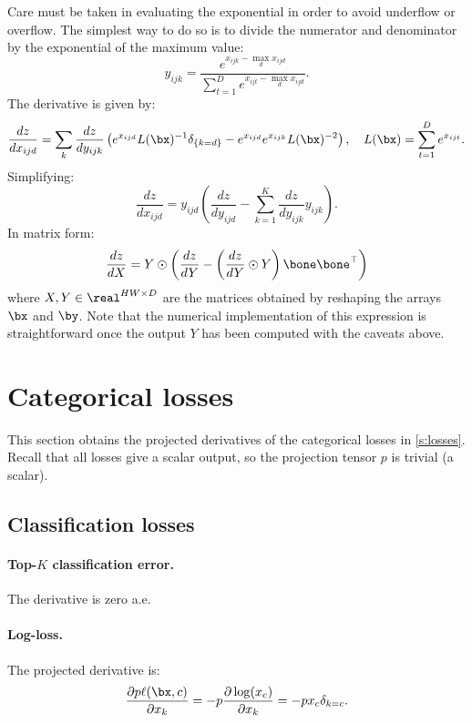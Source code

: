 Care must be taken in evaluating the exponential in order to avoid underflow or overflow. The simplest way to do so is to divide the numerator and denominator by the exponential of the maximum value:
\[
 y_{ijk} = \frac{e^{x_{ijk} - \max_d x_{ijd}}}{\sum_{t=1}^D e^{x_{ijt}- \max_d x_{ijd}}}.
\]
The derivative is given by:
\[
\frac{dz}{d x_{ijd}}
=
\sum_{k}
\frac{dz}{d y_{ijk}}
\left(
e^{x_{ijd}} L(\bx)^{-1} \delta_{\{k=d\}}
-
e^{x_{ijd}}
e^{x_{ijk}} L(\bx)^{-2}
\right),
\quad
L(\bx) = \sum_{t=1}^D e^{x_{ijt}}.
\]
Simplifying:
\[
\frac{dz}{d x_{ijd}}
=
y_{ijd} 
\left(
\frac{dz}{d y_{ijd}}
-
\sum_{k=1}^K
\frac{dz}{d y_{ijk}} y_{ijk}
\right).
\]
In matrix form:
\[
  \frac{dz}{dX} = Y \odot \left(\frac{dz}{dY} 
  - \left(\frac{dz}{dY} \odot Y\right) \bone\bone^\top\right)
\]
where $X,Y\in\real^{HW\times D}$ are the matrices obtained by reshaping the arrays
$\bx$ and $\by$. Note that the numerical implementation of this expression is straightforward once the output $Y$ has been computed with the caveats above.

\section{Categorical losses}\label{s:impl-losses}

This section obtains the projected derivatives of the categorical losses in \cref{s:losses}. Recall that all losses give a scalar output, so the projection tensor $p$ is trivial (a scalar).

\subsection{Classification losses}\label{s:impl-loss-classification}

\paragraph{Top-$K$ classification error.} The derivative is zero a.e.\

\paragraph{Log-loss.} The projected derivative is:
\[
\frac{\partial p \ell(\bx,c)}{\partial x_k}
=
- p \frac{\partial \log (x_c) }{\partial x_k}
=
- p x_c \delta_{k=c}.
\]

